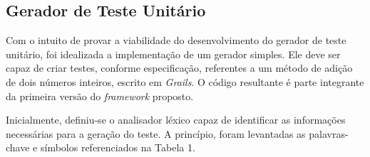 \subsection{Gerador de Teste Unitário}
Com o intuito de provar a viabilidade do desenvolvimento do gerador de teste
unitário, foi idealizada a implementação de um gerador simples. Ele deve ser capaz
de criar testes, conforme especificação, referentes a um método de adição de dois
números inteiros, escrito em \textit{Grails}. O código resultante é parte
integrante da primeira versão do \textit{framework} proposto.
\par
\indent Inicialmente, definiu-se o analisador léxico capaz de identificar as
informações necessárias para a geração do teste. A princípio, foram levantadas
as palavras-chave e símbolos referenciados na Tabela 1.

